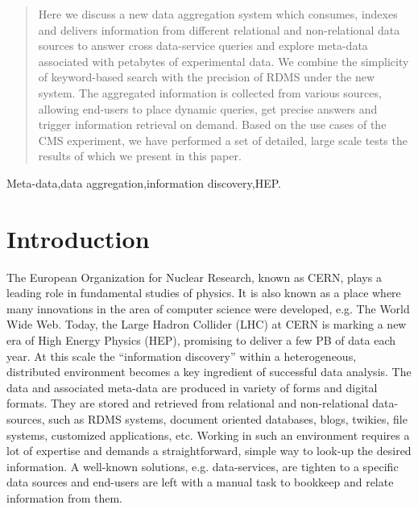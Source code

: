 \documentclass[1p,times]{elsarticle}
\begin{document}
\begin{frontmatter}
\begin{abstract}
Here we discuss a new data aggregation system which consumes, 
indexes and delivers information from different relational and 
non-relational data sources to answer cross data-service queries 
and explore meta-data associated with petabytes of experimental data. 
We combine the simplicity of keyword-based search with the precision of RDMS
under the new system. The aggregated information is collected from various sources,
allowing end-users to place dynamic queries, get precise answers and 
trigger information retrieval on demand. Based on the use cases of the CMS experiment, 
we have performed a set of detailed, large scale tests the results of which 
we present in this paper.
\end{abstract}

\begin{keyword}
Meta-data\sep data aggregation\sep information discovery\sep HEP.


\end{keyword}

\end{frontmatter}


\section{Introduction}
The European Organization for Nuclear Research, known as CERN, plays a leading
role in fundamental studies of physics. It is also known as a place where
many innovations in the area of computer science were developed, e.g. The World Wide Web.
Today, the Large Hadron Collider (LHC) at CERN is marking a new era of High Energy
Physics (HEP), promising to deliver a few PB of data each year. 
At this scale the ``information discovery'' within a heterogeneous, distributed 
environment becomes a key ingredient of successful data analysis.
The data and associated meta-data are produced in variety of forms and digital formats.
They are stored and retrieved from relational and non-relational data-sources, such as 
RDMS systems, document oriented databases, blogs, twikies, file systems,
customized applications, etc. Working in such an environment requires a lot 
of expertise and demands a straightforward, simple
way to look-up the desired information.
A well-known solutions, e.g. data-services, are tighten to a specific data 
sources and end-users are left with a manual task to bookkeep and 
relate information from them.
\end{document}
